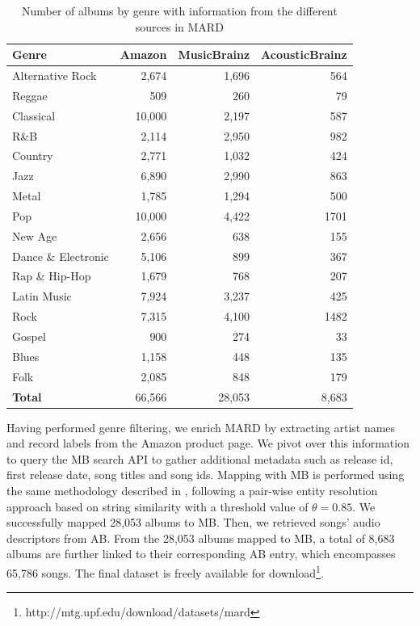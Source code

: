 \begin{table}[h]
\scriptsize
\centering
\begin{tabular}{|l|r|r|r|}
\hline
\textbf{Genre} & \textbf{Amazon} & \textbf{MusicBrainz} & \textbf{AcousticBrainz} \\
\hline
Alternative Rock & 2,674 & 1,696 & 564 \\
Reggae & 509 & 260 & 79 \\
Classical & 10,000 & 2,197 & 587 \\
R\&B & 2,114 & 2,950 & 982 \\
Country & 2,771 & 1,032 & 424 \\
Jazz & 6,890 & 2,990 & 863 \\
Metal & 1,785 & 1,294 & 500 \\
Pop & 10,000 & 4,422 & 1701 \\
New Age & 2,656 & 638 & 155 \\
Dance \& Electronic & 5,106 & 899 & 367 \\
Rap \& Hip-Hop & 1,679 & 768 & 207 \\
Latin Music & 7,924 & 3,237 & 425 \\
Rock & 7,315 & 4,100 & 1482 \\
Gospel & 900 & 274 & 33 \\
Blues & 1,158 & 448 & 135 \\
Folk & 2,085 & 848 & 179 \\
\hline
\textbf{Total} & 66,566 & 28,053 & 8,683 \\
\hline
\end{tabular}
\caption{Number of albums by genre with information from the different sources in MARD}
\label{tbl:dataset}
\end{table}

Having performed genre filtering, we enrich MARD by extracting artist names and record labels from the Amazon product page. We pivot over this information to query the MB search API to gather additional metadata such as release id, first release date, song titles and song ids. Mapping with MB is performed using the same methodology described in \cite{Oramas2015b}, following a pair-wise entity resolution approach based on string similarity with a threshold value of $\theta=0.85$. We successfully mapped 28,053 albums to MB. Then, we retrieved songs' audio descriptors from AB. From the 28,053 albums mapped to MB, a total of 8,683 albums are further linked to their corresponding AB entry, which encompasses 65,786 songs. The final dataset is freely available for download\footnote{http://mtg.upf.edu/download/datasets/mard}.

